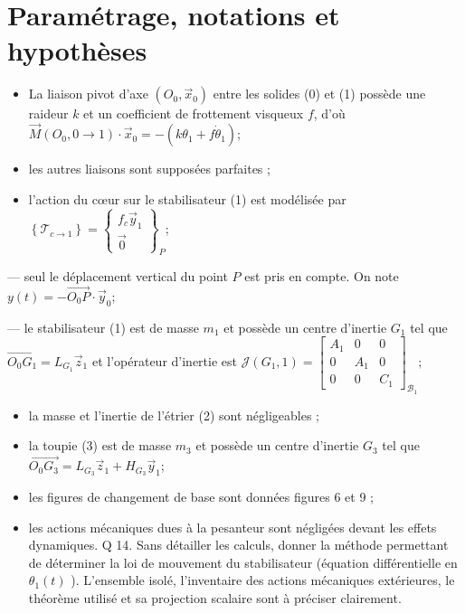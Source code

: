\section{Paramétrage, notations et hypothèses}
\begin{itemize}
  \item La liaison pivot d'axe $\left(O_{0}, \vec{x}_{0}\right)$ entre les solides (0) et (1) possède une raideur $k$ et un coefficient de frottement visqueux $f$, d'où $\vec{M}\left(O_{0}, 0 \rightarrow 1\right) \cdot \vec{x}_{0}=-\left(k \theta_{1}+f \dot{\theta}_{1}\right)$;

  \item les autres liaisons sont supposées parfaites ;

  \item l'action du cœur sur le stabilisateur (1) est modélisée par $\left\{\mathcal{T}_{c \rightarrow 1}\right\}=\left\{\begin{array}{c}f_{c} \vec{y}_{1} \\ \overrightarrow{0}\end{array}\right\}_{P}$;

\end{itemize}

— seul le déplacement vertical du point $P$ est pris en compte. On note $y(t)=-\overrightarrow{O_{0} P} \cdot \vec{y}_{0}$;

— le stabilisateur (1) est de masse $m_{1}$ et possède un centre d'inertie $G_{1}$ tel que $\overrightarrow{O_{0} G_{1}}=L_{G_{1}} \vec{z}_{1}$ et l'opérateur d'inertie est $\mathcal{J}\left(G_{1}, 1\right)=\left[\begin{array}{ccc}A_{1} & 0 & 0 \\ 0 & A_{1} & 0 \\ 0 & 0 & C_{1}\end{array}\right]_{\mathcal{B}_{1}} ;$

\begin{itemize}
  \item la masse et l'inertie de l'étrier (2) sont négligeables ;

  \item la toupie (3) est de masse $m_{3}$ et possède un centre d'inertie $G_{3}$ tel que $\overrightarrow{O_{0} G_{3}}=L_{G_{3}} \vec{z}_{1}+H_{G_{3}} \vec{y}_{1}$;

  \item les figures de changement de base sont données figures 6 et 9 ;

  \item les actions mécaniques dues à la pesanteur sont négligées devant les effets dynamiques. Q 14. Sans détailler les calculs, donner la méthode permettant de déterminer la loi de mouvement du stabilisateur (équation différentielle en $\theta_{1}(t)$ ). L'ensemble isolé, l'inventaire des actions mécaniques extérieures, le théorème utilisé et sa projection scalaire sont à préciser clairement.

\end{itemize}

